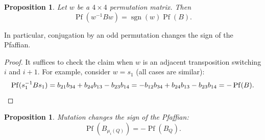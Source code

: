 \documentclass[11pt, letterpaper]{amsart}
\newtheorem{proposition}[theorem]{Proposition}
\theoremstyle{definition}
\newtheorem{remark}[theorem]{Remark}
\numberwithin{equation}{section}
\newcommand\Pf{\operatorname{Pf}}
\newcommand\sgn{\operatorname{sgn}}
\begin{document}
\begin{proposition}
\label{pr:relabeling-changes-pff}
Let $w$ be a $4\times 4$ permutation matrix. Then 
\begin{equation*}
\Pf(w^{-1}Bw)=\sgn(w)\Pf(B).
\end{equation*} 
\end{proposition}

In particular, conjugation by an odd permutation changes the sign of the Pfaffian. 

\begin{proof}
It suffices to check the claim when $w$ is an adjacent transposition switching $i$ and $i+1$. 
For example, consider $w=s_1$ (all cases are similar): %
\begin{equation*}
\Pf(s_1^{-1}Bs_1) = b_{21} b_{34} + b_{24} b_{13} - b_{23} b_{14}
= -b_{12} b_{34} + b_{24} b_{13} - b_{23} b_{14}=-\Pf(B). 
\qedhere
\end{equation*}
\end{proof}


\begin{proposition}
\label{pr:Invariance-of-Pff}
Mutation changes the sign of the Pfaffian: 
\begin{equation*}
\Pf(B_{\mu_i(Q)})=-\Pf(B_Q). 
\end{equation*}
\end{proposition}
\end{document}
